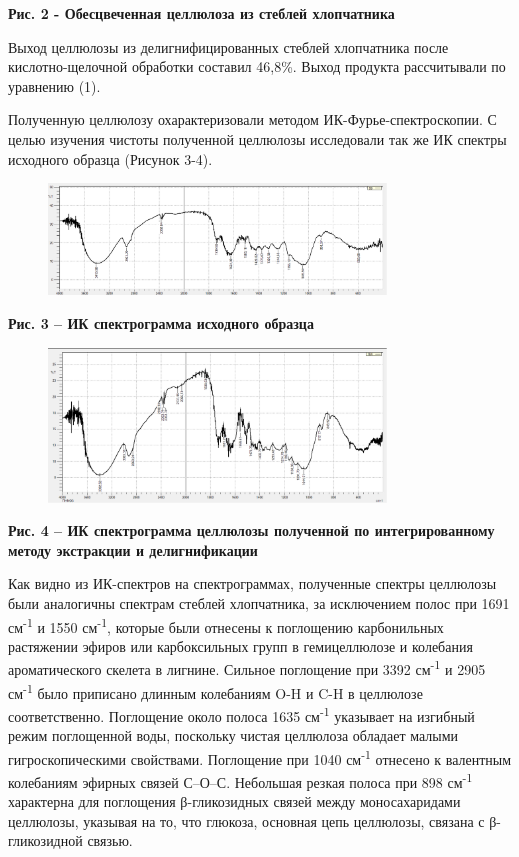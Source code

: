{\bfseries Рис. 2 - Обесцвеченная целлюлоза из стеблей хлопчатника}

Выход целлюлозы из делигнифицированных стеблей хлопчатника после
кислотно-щелочной обработки составил 46,8\%. Выход продукта рассчитывали
по уравнению (1).

Полученную целлюлозу охарактеризовали методом ИК-Фурье-спектроскопии. С
целью изучения чистоты полученной целлюлозы исследовали так же ИК
спектры исходного образца (Рисунок 3-4).

\begin{figure}[H]
	\centering
	\includegraphics[width=0.8\textwidth]{assets/78}
	\caption*{}
\end{figure}

{\bfseries Рис. 3 -- ИК спектрограмма исходного образца}

\begin{figure}[H]
	\centering
	\includegraphics[width=0.8\textwidth]{assets/79}
	\caption*{}
\end{figure}

{\bfseries Рис. 4 -- ИК спектрограмма целлюлозы полученной по
интегрированному методу экстракции и делигнификации}

Как видно из ИК-спектров на спектрограммах, полученные спектры целлюлозы
были аналогичны спектрам стеблей хлопчатника, за исключением полос при
1691 см\textsuperscript{-1} и 1550 см\textsuperscript{-1}, которые были
отнесены к поглощению карбонильных растяжении эфиров или карбоксильных
групп в гемицеллюлозе и колебания ароматического скелета в лигнине.
Сильное поглощение при 3392 см\textsuperscript{-1} и 2905
см\textsuperscript{-1} было приписано длинным колебаниям O-H и C-H в
целлюлозе соответственно. Поглощение около полоса 1635
см\textsuperscript{-1} указывает на изгибный режим поглощенной воды,
поскольку чистая целлюлоза обладает малыми гигроскопическими свойствами.
Поглощение при 1040 см\textsuperscript{-1} отнесено к валентным
колебаниям эфирных связей С--О--С. Небольшая резкая полоса при 898
см\textsuperscript{-1} характерна для поглощения β-гликозидных связей
между моносахаридами целлюлозы, указывая на то, что глюкоза, основная
цепь целлюлозы, связана с β-гликозидной связью.

